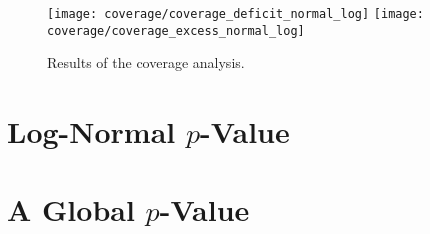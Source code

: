 \begin{figure}
    \texttt{[image: coverage/coverage\_deficit\_normal\_log]}
    \texttt{[image: coverage/coverage\_excess\_normal\_log]}
    \caption{Results of the coverage analysis.}
    \label{fig:coverage2}
\end{figure}
\section{Log-Normal $p$-Value}

\section{A Global $p$-Value}
